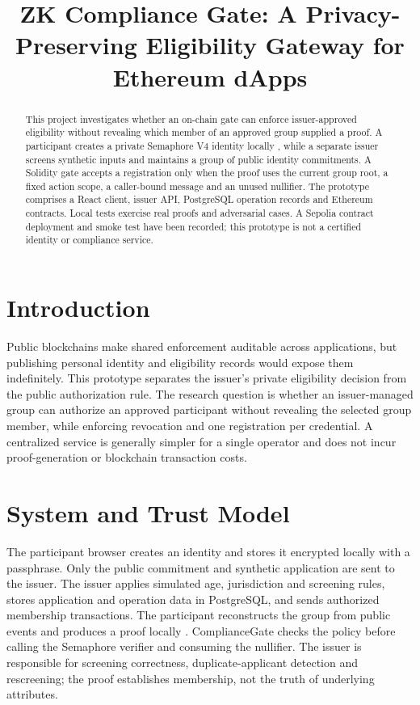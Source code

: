 \documentclass[conference]{IEEEtran}
\title{ZK Compliance Gate: A Privacy-Preserving Eligibility Gateway for Ethereum dApps}
\author{\IEEEauthorblockN{Bùi Quang Minh}\IEEEauthorblockA{Vietnamese-German University\\61CSE325, Winter Semester 2026}}
\begin{document}
\maketitle
\begin{abstract}This project investigates whether an on-chain gate can enforce issuer-approved eligibility without revealing which member of an approved group supplied a proof. A participant creates a private Semaphore V4 identity locally \cite{semaphore}, while a separate issuer screens synthetic inputs and maintains a group of public identity commitments. A Solidity gate accepts a registration only when the proof uses the current group root, a fixed action scope, a caller-bound message and an unused nullifier. The prototype comprises a React client, issuer API, PostgreSQL operation records and Ethereum contracts. Local tests exercise real proofs and adversarial cases. A Sepolia contract deployment and smoke test have been recorded; this prototype is not a certified identity or compliance service.\end{abstract}
\section{Introduction}
Public blockchains make shared enforcement auditable across applications, but publishing personal identity and eligibility records would expose them indefinitely. This prototype separates the issuer's private eligibility decision from the public authorization rule. The research question is whether an issuer-managed group can authorize an approved participant without revealing the selected group member, while enforcing revocation and one registration per credential. A centralized service is generally simpler for a single operator and does not incur proof-generation or blockchain transaction costs.

\section{System and Trust Model}
The participant browser creates an identity and stores it encrypted locally with a passphrase. Only the public commitment and synthetic application are sent to the issuer. The issuer applies simulated age, jurisdiction and screening rules, stores application and operation data in PostgreSQL, and sends authorized membership transactions. The participant reconstructs the group from public events and produces a proof locally \cite{groups,proofs}. ComplianceGate checks the policy before calling the Semaphore verifier and consuming the nullifier. The issuer is responsible for screening correctness, duplicate-applicant detection and rescreening; the proof establishes membership, not the truth of underlying attributes.
\end{document}
